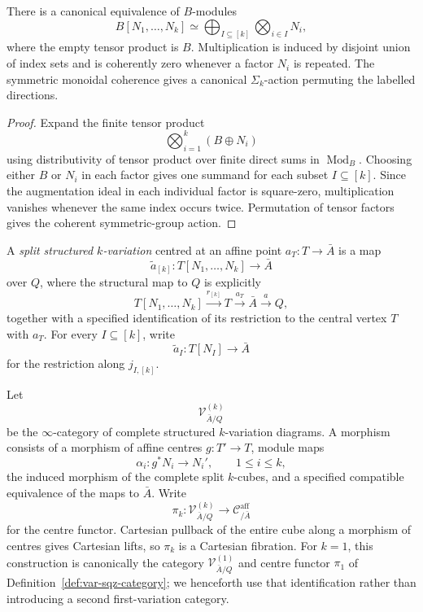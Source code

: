 \begin{proposition}
\label{prop:var-k-cube-module}
There is a canonical equivalence of \(B\)-modules
\[
    \boxed{
    B[N_1,\ldots,N_k]
    \simeq
    \bigoplus_{I\subseteq[k]}
    \bigotimes_{i\in I}N_i,
    }
\]
where the empty tensor product is \(B\). Multiplication is induced by disjoint union of index sets and is coherently zero whenever a factor \(N_i\) is repeated. The symmetric monoidal coherence gives a canonical \(\Sigma_k\)-action permuting the labelled directions.
\end{proposition}

\begin{proof}
Expand the finite tensor product
\[
    \bigotimes_{i=1}^k(B\oplus N_i)
\]
using distributivity of tensor product over finite direct sums in \(\operatorname{Mod}_B\). Choosing either \(B\) or \(N_i\) in each factor gives one summand for each subset \(I\subseteq[k]\). Since the augmentation ideal in each individual factor is square-zero, multiplication vanishes whenever the same index occurs twice. Permutation of tensor factors gives the coherent symmetric-group action.
\end{proof}

\begin{definition}
\label{def:var-k-variation}
A \emph{split structured \(k\)-variation} centred at an affine point \(a_T:T\to\bar A\) is a map
\[
    \widetilde a_{[k]}:
    T[N_1,\ldots,N_k]
    \longrightarrow
    \bar A
\]
over \(Q\), where the structural map to \(Q\) is explicitly
\[
    T[N_1,\ldots,N_k]
    \xrightarrow{r_{[k]}}
    T
    \xrightarrow{a_T}
    \bar A
    \xrightarrow{a}
    Q,
\]
together with a specified identification of its restriction to the central vertex \(T\) with \(a_T\). For every \(I\subseteq[k]\), write
\[
    \widetilde a_I:
    T[N_I]\longrightarrow\bar A
\]
for the restriction along \(j_{I,[k]}\).

Let
\[
    \mathcal V^{(k)}_{\bar A/Q}
\]
be the \(\infty\)-category of complete structured \(k\)-variation diagrams. A morphism consists of a morphism of affine centres \(g:T'\to T\), module maps
\[
    \alpha_i:g^*N_i\longrightarrow N_i',
    \qquad 1\le i\le k,
\]
the induced morphism of the complete split \(k\)-cubes, and a specified compatible equivalence of the maps to \(\bar A\). Write
\[
    \pi_k:
    \mathcal V^{(k)}_{\bar A/Q}
    \longrightarrow
    \mathcal C^{\mathrm{aff}}_{/\bar A}
\]
for the centre functor. Cartesian pullback of the entire cube along a morphism of centres gives Cartesian lifts, so \(\pi_k\) is a Cartesian fibration. For \(k=1\), this construction is canonically the category \(\mathcal V^{(1)}_{\bar A/Q}\) and centre functor \(\pi_1\) of Definition~\ref{def:var-sqz-category}; we henceforth use that identification rather than introducing a second first-variation category.
\end{definition}

